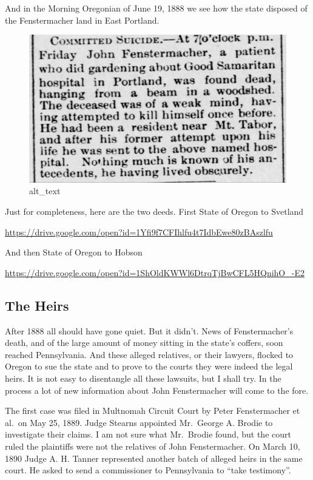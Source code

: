 \documentclass[
  12pt,
]{book}
\begin{document}
And in the Morning Oregonian of June 19, 1888 we see how the state disposed of the Fenstermacher land in East Portland.

\begin{figure}
\centering
\includegraphics{images/0204b_images/image5.jpg}
\caption{alt\_text}
\end{figure}

Just for completeness, here are the two deeds. First State of Oregon to Svetland

\url{https://drive.google.com/open?id=1Yfi9f7CFIhlfu4t7IdbEwe80zBAszlfu}

And then State of Oregon to Hobson

\url{https://drive.google.com/open?id=1ShOldKWWl6DtrqTjBwCFL5HQnihO_-E2}

\hypertarget{the-heirs}{%
\subsection{The Heirs}\label{the-heirs}}

After 1888 all should have gone quiet. But it didn't. News of Fenstermacher's death, and of the large amount of money sitting in the state's coffers, soon reached Pennsylvania. And these alleged relatives, or their lawyers, flocked to Oregon to sue the state and to prove to the courts they were indeed the legal heirs. It is not easy to disentangle all these lawsuits, but I shall try. In the process a lot of new information about John Fenstermacher will come to the fore.

The first case was filed in Multnomah Circuit Court by Peter Fenstermacher et al.~on May 25, 1889. Judge Stearns appointed Mr.~George A. Brodie to investigate their claims. I am not sure what Mr.~Brodie found, but the court ruled the plaintiffs were not the relatives of John Fenstermacher. On March 10, 1890 Judge A. H. Tanner represented another batch of alleged heirs in the same court. He asked to send a commissioner to Pennsylvania to ``take testimony''.
\end{document}
